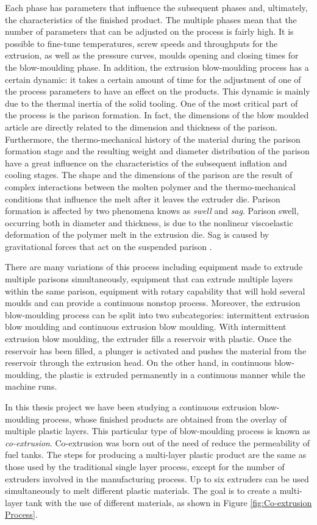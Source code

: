 Each phase has parameters that influence the subsequent phases and, ultimately, the characteristics of the finished product. The multiple phases mean that the number of parameters that can be adjusted on the process is fairly high. It is possible to fine-tune temperatures, screw speeds and throughputs for the extrusion, as well as the  pressure curves, moulds opening and closing times for the blow-moulding phase. In addition, the extrusion blow-moulding process has a certain dynamic: it takes a certain amount of time for the adjustment of one of the process parameters to have an effect on the products. This dynamic is mainly due to the thermal inertia of the solid tooling.
One of the most critical part of the process is the parison formation. In fact, the dimensions of the blow moulded article are directly related to the dimension and thickness of the parison. Furthermore, the thermo-mechanical history of the material during the parison formation stage and the resulting weight and diameter distribution of the parison have a great influence on the characteristics of the subsequent inflation and cooling stages. The shape and the dimensions of the parison are the result of complex interactions between the molten polymer and the thermo-mechanical conditions that influence the melt after it leaves the extruder die. Parison formation is affected by two phenomena knows as \textit{swell} and \textit{sag}. Parison swell, occurring both in diameter and thickness, is due to the nonlinear viscoelastic deformation of the polymer melt in the extrusion die. Sag is caused by gravitational forces that act on the suspended parison \citep{huang2002prediction}.

There are many variations of this process including equipment made to extrude multiple parisons simultaneously, equipment that can extrude multiple layers within the same parison, equipment with rotary capability that will hold several moulds and can provide a continuous nonstop process. Moreover, the extrusion blow-moulding process can be split into two subcategories: intermittent extrusion blow moulding and continuous extrusion blow moulding. With intermittent extrusion blow moulding, the extruder fills a reservoir with plastic. Once the reservoir has been filled, a plunger is activated and pushes the material from the reservoir through the extrusion head. On the other hand, in continuous blow-moulding, the plastic is extruded permanently in a continuous manner while the machine runs.

In this thesis project we have been studying a continuous extrusion blow-moulding process, whose finished products are obtained from the overlay of multiple plastic layers. This particular type of blow-moulding process is known as \textit{co-extrusion}. Co-extrusion was born out of the need of reduce the permeability of fuel tanks. The steps for producing a multi-layer plastic product are the same as those used by the traditional single layer process, except for the number of extruders involved in the manufacturing process. Up to six extruders can be used simultaneously to melt different plastic materials. The goal is to create a multi-layer tank with the use of different materials, as shown in Figure \ref{fig:Co-extrusion Process}.


